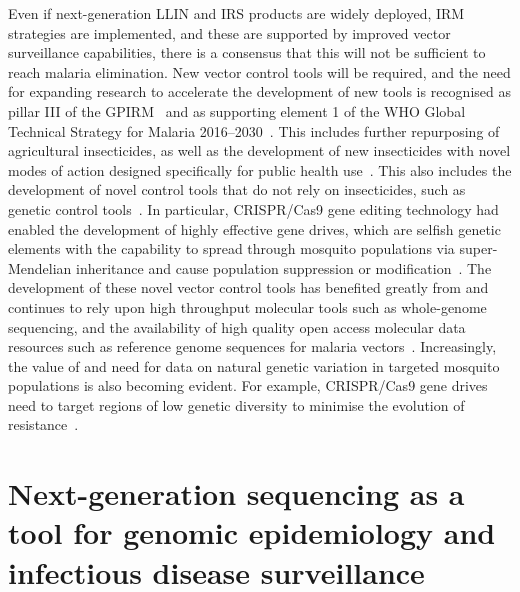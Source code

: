 \begin{refsection}
 
Even if next-generation LLIN and IRS products are widely deployed, IRM strategies are implemented, and these are supported by improved vector surveillance capabilities, there is a consensus that this will not be sufficient to reach malaria elimination.
%
New vector control tools will be required, and the need for expanding research to accelerate the development of new tools is recognised as pillar \RN{3} of the GPIRM~\parencite{WHO2012GPIRM} and as supporting element 1 of the WHO Global Technical Strategy for Malaria 2016--2030~\parencite{WHO2015GTS}.
%
This includes further repurposing of agricultural insecticides, as well as the development of new insecticides with novel modes of action designed specifically for public health use~\parencite{Hemingway2006,Lees2019}.
%
This also includes the development of novel control tools that do not rely on insecticides, such as genetic control tools~\parencite{Davidson1974,Burt2003}.
%
In particular, CRISPR/Cas9 gene editing technology had enabled the development of highly effective gene drives, which are selfish genetic elements with the capability to spread through mosquito populations via super-Mendelian inheritance and cause population suppression or modification~\parencite{Burt2003,Kyrou2018}.
%
The development of these novel vector control tools has benefited greatly from and continues to rely upon high throughput molecular tools such as whole-genome sequencing, and the availability of high quality open access molecular data resources such as reference genome sequences for malaria vectors~\parencite{Holt2002,Sharakhova2007,Lawniczak2010,Neafsey2015}.
%
Increasingly, the value of and need for data on natural genetic variation in targeted mosquito populations is also becoming evident.
%
For example, CRISPR/Cas9 gene drives need to target regions of low genetic diversity to minimise the evolution of resistance~\parencite{Kyrou2018}.


\section[Next-generation sequencing]{Next-generation sequencing as a tool for genomic epidemiology and infectious disease surveillance}\label{sec:NGS}



\end{refsection}
